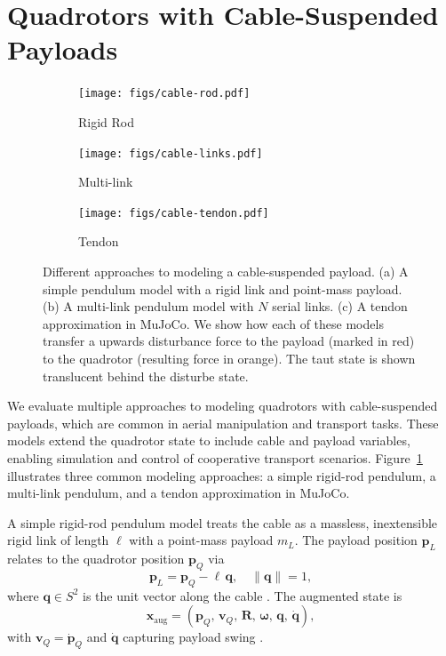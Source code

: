 \section{Quadrotors with Cable-Suspended Payloads}
\label{sec:quadrotor_with_payloads}
\begin{figure}

  \centering
  \begin{subfigure}[t]{0.3\textwidth}
    \centering
    \texttt{[image: figs/cable-rod.pdf]}
    \caption{Rigid Rod}
  \end{subfigure}
  \begin{subfigure}[t]{0.3\textwidth}
    \centering
    \texttt{[image: figs/cable-links.pdf]}
    \caption{Multi-link}
  \end{subfigure}
  \begin{subfigure}[t]{0.3\textwidth}
    \centering
    \texttt{[image: figs/cable-tendon.pdf]}
    \caption{Tendon}
  \end{subfigure}
  \caption[Cable Modeling Approaches]{Different approaches to modeling a cable-suspended payload. (a) A simple pendulum model with a rigid link and point-mass payload. (b) A multi-link pendulum model with \(N\) serial links. (c) A tendon approximation in MuJoCo. We show how each of these models transfer a upwards disturbance force to the payload (marked in red) to the quadrotor (resulting force in orange). The taut state is shown translucent behind the disturbe state.}
  \label{fig:cable_models}
\end{figure}
We evaluate multiple approaches to modeling quadrotors with cable-suspended payloads, which are common in aerial manipulation and transport tasks. These models extend the quadrotor state to include cable and payload variables, enabling simulation and control of cooperative transport scenarios. Figure~\ref{fig:cable_models} illustrates three common modeling approaches: a simple rigid-rod pendulum, a multi-link pendulum, and a tendon approximation in MuJoCo.

A simple rigid-rod pendulum model treats the cable as a massless, inextensible rigid link of length \(\ell\) with a point-mass payload \(m_L\). The payload position \(\mathbf{p}_L\) relates to the quadrotor position \(\mathbf{p}_Q\) via
\begin{equation}
\mathbf{p}_L = \mathbf{p}_Q - \ell\,\mathbf{q}, 
\quad
\|\mathbf{q}\| = 1,
\end{equation}
where \(\mathbf{q}\in S^2\) is the unit vector along the cable \cite{estevez_review_2024}. The augmented state is
\begin{equation}
\mathbf{x}_{\mathrm{aug}} = (\mathbf{p}_Q,\,\mathbf{v}_Q,\,\mathbf{R},\,\boldsymbol{\omega},\,\mathbf{q},\,\dot{\mathbf{q}}),
\end{equation}
with \(\mathbf{v}_Q = \dot{\mathbf{p}}_Q\) and \(\dot{\mathbf{q}}\) capturing payload swing \cite{wahba_kinodynamic_2024}.

